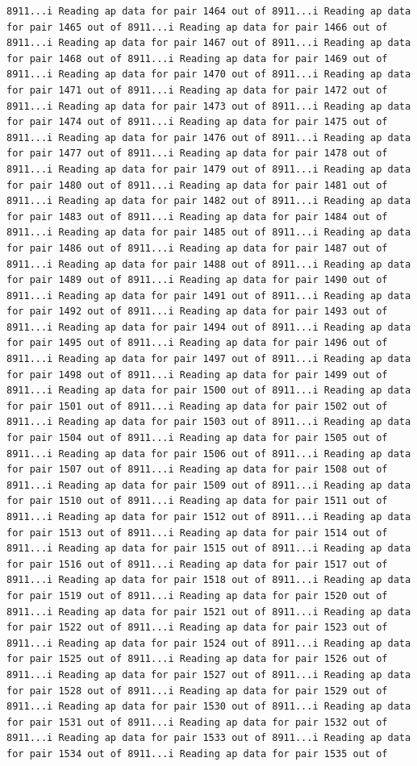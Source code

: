 \documentclass[
]{article}
\begin{document}
\begin{verbatim}
8911...i Reading ap data for pair 1464 out of 8911...i Reading ap data for pair 1465 out of 8911...i Reading ap data for pair 1466 out of 8911...i Reading ap data for pair 1467 out of 8911...i Reading ap data for pair 1468 out of 8911...i Reading ap data for pair 1469 out of 8911...i Reading ap data for pair 1470 out of 8911...i Reading ap data for pair 1471 out of 8911...i Reading ap data for pair 1472 out of 8911...i Reading ap data for pair 1473 out of 8911...i Reading ap data for pair 1474 out of 8911...i Reading ap data for pair 1475 out of 8911...i Reading ap data for pair 1476 out of 8911...i Reading ap data for pair 1477 out of 8911...i Reading ap data for pair 1478 out of 8911...i Reading ap data for pair 1479 out of 8911...i Reading ap data for pair 1480 out of 8911...i Reading ap data for pair 1481 out of 8911...i Reading ap data for pair 1482 out of 8911...i Reading ap data for pair 1483 out of 8911...i Reading ap data for pair 1484 out of 8911...i Reading ap data for pair 1485 out of 8911...i Reading ap data for pair 1486 out of 8911...i Reading ap data for pair 1487 out of 8911...i Reading ap data for pair 1488 out of 8911...i Reading ap data for pair 1489 out of 8911...i Reading ap data for pair 1490 out of 8911...i Reading ap data for pair 1491 out of 8911...i Reading ap data for pair 1492 out of 8911...i Reading ap data for pair 1493 out of 8911...i Reading ap data for pair 1494 out of 8911...i Reading ap data for pair 1495 out of 8911...i Reading ap data for pair 1496 out of 8911...i Reading ap data for pair 1497 out of 8911...i Reading ap data for pair 1498 out of 8911...i Reading ap data for pair 1499 out of 8911...i Reading ap data for pair 1500 out of 8911...i Reading ap data for pair 1501 out of 8911...i Reading ap data for pair 1502 out of 8911...i Reading ap data for pair 1503 out of 8911...i Reading ap data for pair 1504 out of 8911...i Reading ap data for pair 1505 out of 8911...i Reading ap data for pair 1506 out of 8911...i Reading ap data for pair 1507 out of 8911...i Reading ap data for pair 1508 out of 8911...i Reading ap data for pair 1509 out of 8911...i Reading ap data for pair 1510 out of 8911...i Reading ap data for pair 1511 out of 8911...i Reading ap data for pair 1512 out of 8911...i Reading ap data for pair 1513 out of 8911...i Reading ap data for pair 1514 out of 8911...i Reading ap data for pair 1515 out of 8911...i Reading ap data for pair 1516 out of 8911...i Reading ap data for pair 1517 out of 8911...i Reading ap data for pair 1518 out of 8911...i Reading ap data for pair 1519 out of 8911...i Reading ap data for pair 1520 out of 8911...i Reading ap data for pair 1521 out of 8911...i Reading ap data for pair 1522 out of 8911...i Reading ap data for pair 1523 out of 8911...i Reading ap data for pair 1524 out of 8911...i Reading ap data for pair 1525 out of 8911...i Reading ap data for pair 1526 out of 8911...i Reading ap data for pair 1527 out of 8911...i Reading ap data for pair 1528 out of 8911...i Reading ap data for pair 1529 out of 8911...i Reading ap data for pair 1530 out of 8911...i Reading ap data for pair 1531 out of 8911...i Reading ap data for pair 1532 out of 8911...i Reading ap data for pair 1533 out of 8911...i Reading ap data for pair 1534 out of 8911...i Reading ap data for pair 1535 out of 
\end{verbatim}
\end{document}
